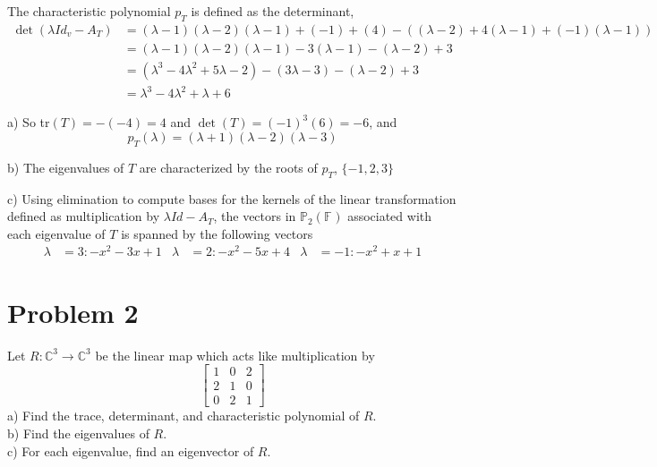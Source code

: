 \documentclass[
	12pt, %
]{fphw}
\newcommand\br{\vspace{10 pt}}
\newcommand\0{\mathbf{0}}
\newcommand\set[1]{\{#1\}}
\newcommand\C[1]{\text{$\mathbb{C}^{#1}$}}
\newcommand\F[1]{\text{$\mathbb{F}^{#1}$}}
\newcommand\poly[1]{\text{$\mathbb{P}_{#1}(\F{})$}}
\begin{document}
\br
\noindent
The characteristic polynomial $p_T$ is defined as the determinant,
\begin{align*}
\det(\lambda Id_v - A_T) &= (\lambda - 1)(\lambda - 2)(\lambda - 1) + (-1) + (4) - ((\lambda - 2) + 4(\lambda - 1) + (-1)(\lambda-1))\\
&= (\lambda - 1)(\lambda - 2)(\lambda - 1) - 3(\lambda - 1) - (\lambda - 2) + 3\\
&= (\lambda^3 - 4 \lambda^2 + 5 \lambda -2) - (3 \lambda - 3) - (\lambda - 2) + 3\\
&= \lambda^3 - 4 \lambda^2 + \lambda + 6
\end{align*}

\br
\noindent
a) So tr$(T) = -(-4) = 4$ and $\det(T) = (-1)^3(6) = -6$, and
$$
p_T(\lambda) = (\lambda+1)(\lambda-2)(\lambda-3)
$$

\br
\noindent
b) The eigenvalues of $T$ are characterized by the roots of $p_T$, $\set{-1, 2, 3}$

\br
\noindent
c) Using elimination to compute bases for the kernels of the linear transformation defined as multiplication by $\lambda Id - A_T$, the vectors in $\poly{2}$ associated with each eigenvalue of $T$ is spanned by the following vectors
\begin{align*}
\lambda &= 3 : -x^2-3x+1 & \lambda &= 2 : -x^2-5x+4 & \lambda &= -1 : -x^2+x+1
\end{align*}

\newpage
\section*{Problem 2}
\begin{problem}
Let $R: \C{3} \to \C{3}$ be the linear map which acts like multiplication by
\begin{equation*}
\begin{bmatrix}
1 & 0 & 2\\
2 & 1 & 0\\
0 & 2 & 1
\end{bmatrix}
\end{equation*}
\noindent
a) Find the trace, determinant, and characteristic polynomial of $R$.\\
b) Find the eigenvalues of $R$.\\
c) For each eigenvalue, find an eigenvector of $R$.
\end{problem}
\end{document}

